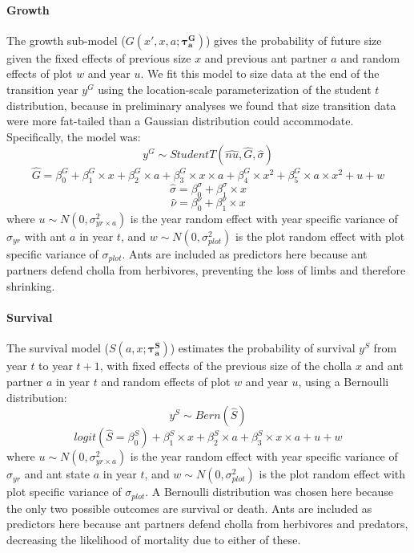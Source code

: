 \documentclass[11pt]{article}
\begin{document}
\paragraph{Growth}
The growth sub-model ($G(x',x,a;\pmb{\tau^G_{a}})$) gives the probability of future size given the fixed effects of previous size $x$ and previous ant partner $a$ and random effects of plot $w$ and year $u$. 
We fit this model to size data at the end of the transition year $y^G$ using the location-scale parameterization of the student $t$ distribution, because in preliminary analyses we found that size transition data were more fat-tailed than a Gaussian distribution could accommodate. 
Specifically, the model was: 
$$y^G \sim Student T(\hat{nu},\hat{G},\hat{\sigma}) $$
$$\hat{G} = \beta_{0}^{G} + \beta_{1}^{G} \times x  + \beta_{2}^{G} \times a + \beta_{3}^{G} \times x \times a  + \beta_{4}^{G} \times x^2 + \beta_{5}^{G} \times a \times x^2 + u + w $$
$$\hat{\sigma} = \beta_{0}^{\sigma} + \beta_{1}^{\sigma} \times x $$
$$\hat{\nu} = \beta_{0}^{\nu} + \beta_{1}^{\nu} \times x $$
where $u \sim N(0,\sigma_{yr \times a}^{2})$ is the year random effect with year specific variance of $\sigma_{yr}$ with ant $a$ in year $t$, and $w \sim N(0,\sigma_{plot}^{2})$ is the plot random effect with plot specific variance of $\sigma_{plot}$. 
Ants are included as predictors here because ant partners defend cholla from herbivores, preventing the loss of limbs and therefore shrinking.

\paragraph{Survival}
The survival model ($S(a,x;\pmb{\tau_{a}^{S}})$) estimates the probability of survival $y^S$ from year $t$ to year $t+1$, with fixed effects of the previous size of the cholla $x$ and ant partner $a$ in year $t$ and random effects of plot $w$ and year $u$, using a Bernoulli distribution:
$$y^S \sim Bern(\hat{S})$$
$$logit(\hat{S} = \beta_{0}^{S}) + \beta_{1}^{S} \times x + \beta_{2}^{S} \times a + \beta_{3}^{S} \times x \times a + u + w$$
where $u \sim N(0,\sigma_{yr \times a}^{2})$ is the year random effect with year specific variance of $\sigma_{yr}$ and ant state $a$ in year $t$, and $w \sim N(0,\sigma_{plot}^{2})$ is the plot random effect with plot specific variance of $\sigma_{plot}$.
A Bernoulli distribution was chosen here because the only two possible outcomes are survival or death. 
Ants are included as predictors here because ant partners defend cholla from herbivores and predators, decreasing the likelihood of mortality due to either of these. 
\end{document}
